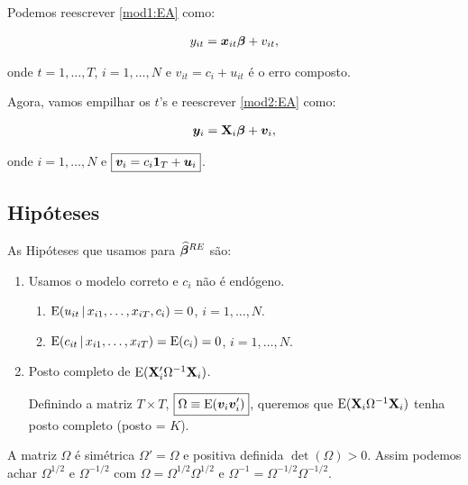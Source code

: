 \documentclass[11pt, oneside, a4paper, article]{article}
\numberwithin{equation}{section}
\begin{document}
\begin{description}
		Podemos reescrever \eqref{mod1:EA} como:

		\vspace{-1 em}
		\begin{align} \label{mod2:EA}
			y_{it} = \boldsymbol{x}_{it} \boldsymbol{\beta} + v_{it},
		\end{align}

		\noindent
		onde
		$t = 1, \dots, T$, $i = 1, \dots, N$ e $\boxed{v_{it} = c_{i} + u_{it}}$ é o erro composto.

		Agora, vamos empilhar os $t$'s e reescrever \eqref{mod2:EA} como:

		\vspace{-1 em}
		\begin{align} \label{mod3:EA}
			\boldsymbol{y}_{i} = \mathbf{X}_{i} \boldsymbol{\beta} + \boldsymbol{v}_{i},
		\end{align}

		\noindent
		onde
		$i = 1, \dots, N$ e $\boxed{\boldsymbol{v}_{i} = c_{i} \boldsymbol{1}_{T} + \boldsymbol{u}_{i}}$.

		\subsection{Hipóteses}

		As Hipóteses que usamos para $\boldsymbol{\widehat{\beta}}^{RE}$ são:

		\begin{enumerate} \itemsep0pt
			\item  
				Usamos o modelo correto e $c_{i}$ não é endógeno.

				\begin{enumerate}[label =\alph*)]
				\item 
					$\text{E}( u_{it} \, | \,  x_{i1}, \dots, x_{iT}, c_{i} ) = 0$,
					$i = 1, \dots, N$.
				\item        
					$\text{E}( c_{it} \, | \, x_{i1}, \dots, x_{iT} ) = \text{E}( c_{i} ) = 0$,
					$i = 1, \dots, N$.
			\end{enumerate}

		\item  Posto completo de $\text{E}( \mathbf{X}_{i}' \Omega^{-1} \mathbf{X}_{i} )$.

			Definindo a matriz $T \times T$, $\boxed{\Omega \equiv \text{E}(\boldsymbol{v}_{i} \boldsymbol{v}_{i}')}$, queremos que $\text{E}( \mathbf{X}_{i} \Omega^{-1} \mathbf{X}_{i} )$ tenha posto completo (posto = $K$).
	\end{enumerate}

	A matriz $\Omega$ é simétrica $\Omega' = \Omega$ e positiva definida $\det(\Omega) > 0$.
	Assim podemos achar $\Omega^{1/2}$ e $\Omega^{-1/2}$ com $\Omega = \Omega^{1/2} \Omega^{1/2}$ e $\Omega^{-1} = \Omega^{-1/2} \Omega^{-1/2}$.


\end{description}
\end{document}
